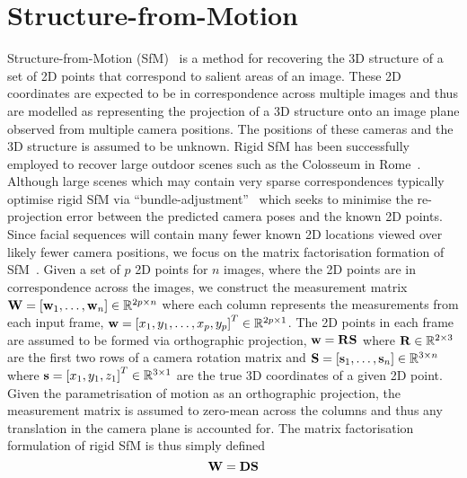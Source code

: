 \section{Structure-from-Motion}\label{sec:bg_sfm}
Structure-from-Motion (SfM)~\cite{ullman1979interpretation,tomasi1992shape,hartley2003multiple}
is a method for recovering the 3D structure of a set of 2D points that
correspond to salient areas of an image. These 2D coordinates are expected to be
in correspondence across multiple images and thus are modelled as representing
the projection of a 3D structure onto an image plane observed from multiple
camera positions. The positions of these cameras and the 3D structure is assumed
to be unknown. Rigid SfM has been successfully employed to recover large outdoor
scenes such as the Colosseum in Rome~\cite{agarwal2009building}. Although large
scenes which may contain very sparse correspondences typically optimise rigid
SfM via ``bundle-adjustment''~\cite{triggs1999bundle} which seeks to
minimise the re-projection error between the predicted camera poses and
the known 2D points. Since facial sequences will contain many fewer
known 2D locations viewed over likely fewer camera positions, we focus on
the matrix factorisation formation of SfM~\cite{tomasi1992shape}. Given
a set of $p$ 2D points for $n$ images, where the 2D points are in
correspondence across the images, we construct
the measurement matrix $\boldsymbol{\mathbf{W}} = [\boldsymbol{\mathbf{w}}_1, \ldots, \boldsymbol{\mathbf{w}}_n] \in \mathbb{R}^{2p \times n}$
where each column represents the measurements from each input frame,
$\boldsymbol{\mathbf{w}} = {[x_1, y_1, \ldots, x_p, y_p]}^T \in \mathbb{R}^{2p \times 1}$. The 2D points
in each frame are assumed to be formed via orthographic projection,
$\boldsymbol{\mathbf{w}} = \boldsymbol{\mathbf{R}} \boldsymbol{\mathbf{S}}$ where $\boldsymbol{\mathbf{R}} \in \mathbb{R}^{2 \times 3}$ are the first two
rows of a camera rotation matrix and
$\boldsymbol{\mathbf{S}} = [\boldsymbol{\mathbf{s}}_1, \ldots, \boldsymbol{\mathbf{s}}_n] \in \mathbb{R}^{3 \times n}$ where
$\boldsymbol{\mathbf{s}} = {[x_1, y_1, z_1]}^T \in \mathbb{R}^{3 \times 1}$ are
the true 3D coordinates of a given 2D point. Given the parametrisation of motion
as an orthographic projection, the measurement matrix is assumed to zero-mean
across the columns and thus any translation in the camera plane is accounted
for. The matrix factorisation formulation of rigid SfM is thus simply defined
\begin{equation}\label{eg:bg_sfm_rigid_objective}
	\boldsymbol{\mathbf{W}} = \boldsymbol{\mathbf{D}} \boldsymbol{\mathbf{S}}
\end{equation}
